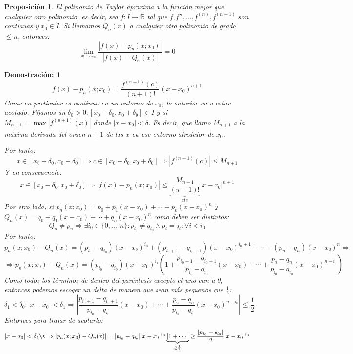\documentclass[10pt,a4paper,openright]{book}
\theoremstyle{break}
\newtheorem*{prop}{Proposición}
\newtheorem*{demo}{\underline{Demostración}:}
\begin{document}
\begin{prop}
El polinomio de Taylor aproxima a la función mejor que cualquier otro polinomio, es decir, sea $f: I\rightarrow\mathbb R$ tal que $f, f'', ..., f^{(n)}, f^{(n+1)}$ son continuas y $x_0\in \mathring{I}$. Si llamamos $Q_n(x)$ a cualquier otro polinomio de grado $\leq n$, entonces:
$$\lim_{x\rightarrow x_0}\frac{|f(x)-p_n(x;x_0)|}{|f(x)-Q_n(x)|}=0$$\end{prop}
\begin{demo}
$$f(x)-p_n(x;x_0)=\frac{f^{(n+1)}(c)}{(n+1)!}(x-x_0)^{n+1}$$
Como en particular es continua en un entorno de $x_0$, lo anterior va a estar acotado. Fijamos un $\delta_0>0 : [x_0-\delta_0, x_0+\delta_0]\in I$ y si $M_{n+1}=\max |f^{(n+1)}(x)|$ donde $|x-x_0|<\delta$. Es decir, que llamo $M_{n+1}$ a la máxima derivada del orden $n+1$ de las $x$ en ese entorno alrededor de $x_0$. 

Por tanto:
$$x\in [x_0-\delta_0, x_0+\delta_0]\Rightarrow c\in [x_0-\delta_0, x_0+\delta_0] \Rightarrow |f^{(n+1)}(c)|\leq M_{n+1}$$
Y en consecuencia:
$$x\in [x_0-\delta_0, x_0+\delta_0]\Rightarrow |f(x)-p_n(x;x_0)|\leq \underbrace{\frac{M_{n+1}}{(n+1)!}}_{cte}|x-x_0|^{n+1}$$
Por otro lado, si $p_n(x;x_0)=p_0+p_1(x-x_0)+\cdots +p_n(x-x_0)^n$ y $Q_n(x)=q_0+q_1(x-x_0)+\cdots +q_n(x-x_0)^n$ como deben ser distintos:
$$Q_n\neq p_n\Rightarrow \exists i_0\in \{0, ..., n\}: p_{i_0}\neq q_{i_0}\wedge p_i=q_i:\forall i < i_0$$
Por tanto:
$$p_n(x;x_0)-Q_n(x)=(p_{i_0}-q_{i_0})(x-x_0)^{i_0}+(p_{i_0+1}-q_{i_0+1})(x-x_0)^{i_0+1}+\cdots + (p_n-q_n)(x-x_0)^{n}\Rightarrow $$
$$\Rightarrow p_n(x;x_0)-Q_n(x)=(p_{i_0}-q_{i_0})(x-x_0)^{i_0}\left( 1+ \frac{p_{i_0+1}-q_{i_0+1}}{p_{i_0}-q_{i_0}}(x-x_0)+\cdots + \frac{p_n-q_n}{p_{i_0}-q_{i_0}}(x-x_0)^{n-i_0}\right)$$
Como todos los términos de dentro del paréntesis excepto el uno van a 0, entonces podemos escoger un delta de manera que sean más pequeños que $\frac{1}{2}$:
$$\delta_1< \delta_0: |x-x_0|<\delta_1\Rightarrow \left| \frac{p_{i_0+1}-q_{i_0+1}}{p_{i_0}-q_{i_0}}(x-x_0)+\cdots + \frac{p_n-q_n}{p_{i_0}-q_{i_0}}(x-x_0)^{n-i_0}\right|\leq \frac{1}{2}$$
Entonces para tratar de acotarlo:
$$|x-x_0|<\delta_1\<\Rightarrow|p_n(x;x_0)-Q_n(x)|=|p_{i_0}-q_{i_0}||x-x_0|^{i_0}\underbrace{\left| 1 + \cdots \right|}_{\geq \frac{1}{2}}\geq \frac{|p_{i_0}-q_{i_0}|}{2}|x-x_0|^{i_0}$$


\end{demo}
\end{document}
